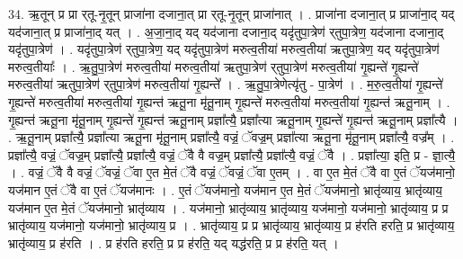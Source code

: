 \documentclass[17pt]{extarticle}
\begin{document}
34. ऋ॒तून् प्र प्रा र्‌तू-नृ॒तून् प्राजा॑ना दजाना॒त् प्रा र्‌तू-नृ॒तून् प्राजा॑नात् । . प्राजा॑ना दजाना॒त् प्र प्राजा॑ना॒द् यद् यद॑जाना॒त् प्र प्राजा॑ना॒द् यत् । . अ॒जा॒ना॒द् यद् यद॑जाना दजाना॒द् यदृ॑तुपा॒त्रेण॑ र्‌तुपा॒त्रेण॒ यद॑जाना दजाना॒द् यदृ॑तुपा॒त्रेण॑ । . यदृ॑तुपा॒त्रेण॑ र्‌तुपा॒त्रेण॒ यद् यदृ॑तुपा॒त्रेण॑ मरुत्व॒तीया॑ मरुत्व॒तीया॑ ऋतुपा॒त्रेण॒ यद् यदृ॑तुपा॒त्रेण॑ मरुत्व॒तीयाः᳚ । . ऋ॒तु॒पा॒त्रेण॑ मरुत्व॒तीया॑ मरुत्व॒तीया॑ ऋतुपा॒त्रेण॑ र्‌तुपा॒त्रेण॑ मरुत्व॒तीया॑ गृ॒ह्यन्ते॑ गृ॒ह्यन्ते॑ मरुत्व॒तीया॑ ऋतुपा॒त्रेण॑ र्‌तुपा॒त्रेण॑ मरुत्व॒तीया॑ गृ॒ह्यन्ते᳚ । . ऋ॒तु॒पा॒त्रेणेत्यृ॑तु - पा॒त्रेण॑ । . म॒रु॒त्व॒तीया॑ गृ॒ह्यन्ते॑ गृ॒ह्यन्ते॑ मरुत्व॒तीया॑ मरुत्व॒तीया॑ गृ॒ह्यन्त॑ ऋतू॒ना मृ॑तू॒नाम् गृ॒ह्यन्ते॑ मरुत्व॒तीया॑ मरुत्व॒तीया॑ गृ॒ह्यन्त॑ ऋतू॒नाम् । . गृ॒ह्यन्त॑ ऋतू॒ना मृ॑तू॒नाम् गृ॒ह्यन्ते॑ गृ॒ह्यन्त॑ ऋतू॒नाम् प्रज्ञा᳚त्यै॒ प्रज्ञा᳚त्या ऋतू॒नाम् गृ॒ह्यन्ते॑ गृ॒ह्यन्त॑ ऋतू॒नाम् प्रज्ञा᳚त्यै । . ऋ॒तू॒नाम् प्रज्ञा᳚त्यै॒ प्रज्ञा᳚त्या ऋतू॒ना मृ॑तू॒नाम् प्रज्ञा᳚त्यै॒ वज्रं॒ ॅवज्र॒म् प्रज्ञा᳚त्या ऋतू॒ना मृ॑तू॒नाम् प्रज्ञा᳚त्यै॒ वज्र᳚म् । . प्रज्ञा᳚त्यै॒ वज्रं॒ ॅवज्र॒म् प्रज्ञा᳚त्यै॒ प्रज्ञा᳚त्यै॒ वज्रं॒ ॅवै वै वज्र॒म् प्रज्ञा᳚त्यै॒ प्रज्ञा᳚त्यै॒ वज्रं॒ ॅवै । . प्रज्ञा᳚त्या॒ इति॒ प्र - ज्ञा॒त्यै॒ । . वज्रं॒ ॅवै वै वज्रं॒ ॅवज्रं॒ ॅवा ए॒त मे॒तं ॅवै वज्रं॒ ॅवज्रं॒ ॅवा ए॒तम् । . वा ए॒त मे॒तं ॅवै वा ए॒तं ॅयज॑मानो॒ यज॑मान ए॒तं ॅवै वा ए॒तं ॅयज॑मानः । . ए॒तं ॅयज॑मानो॒ यज॑मान ए॒त मे॒तं ॅयज॑मानो॒ भ्रातृ॑व्याय॒ भ्रातृ॑व्याय॒ यज॑मान ए॒त मे॒तं ॅयज॑मानो॒ भ्रातृ॑व्याय । . यज॑मानो॒ भ्रातृ॑व्याय॒ भ्रातृ॑व्याय॒ यज॑मानो॒ यज॑मानो॒ भ्रातृ॑व्याय॒ प्र प्र भ्रातृ॑व्याय॒ यज॑मानो॒ यज॑मानो॒ भ्रातृ॑व्याय॒ प्र । . भ्रातृ॑व्याय॒ प्र प्र भ्रातृ॑व्याय॒ भ्रातृ॑व्याय॒ प्र ह॑रति हरति॒ प्र भ्रातृ॑व्याय॒ भ्रातृ॑व्याय॒ प्र ह॑रति । . प्र ह॑रति हरति॒ प्र प्र ह॑रति॒ यद् यद्ध॑रति॒ प्र प्र ह॑रति॒ यत् । \newline
\end{document}

